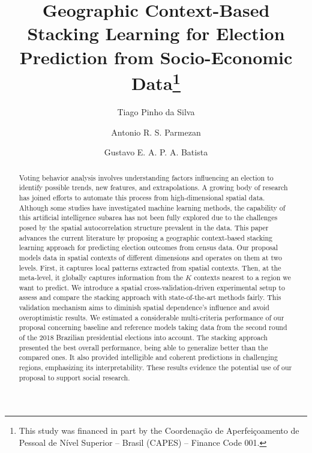 \documentclass[runningheads]{llncs}
\begin{document}
%
\title{Geographic Context-Based Stacking Learning for Election Prediction from Socio-Economic Data\thanks{This study was financed in part by the Coordena{\c{c}}\~{a}o de Aperfei{\c{c}}oamento de Pessoal de N\'{i}vel Superior -- Brasil (CAPES) -- Finance Code 001.}}
%
%
\author{Tiago Pinho da Silva \and
Antonio R. S. Parmezan \and
Gustavo E. A. P. A. Batista}
%
%
%
\maketitle %
%
\begin{abstract}
Voting behavior analysis involves understanding factors influencing an election to identify possible trends, new features, and extrapolations. A growing body of research has joined efforts to automate this process from high-dimensional spatial data. Although some studies have investigated machine learning methods, the capability of this artificial intelligence subarea has not been fully explored due to the challenges posed by the spatial autocorrelation structure prevalent in the data. This paper advances the current literature by proposing a geographic context-based stacking learning approach for predicting election outcomes from census data. Our proposal models data in spatial contexts of different dimensions and operates on them at two levels. First, it captures local patterns extracted from spatial contexts. Then, at the meta-level, it globally captures information from the $K$ contexts nearest to a region we want to predict. We introduce a spatial cross-validation-driven experimental setup to assess and compare the stacking approach with state-of-the-art methods fairly. This validation mechanism aims to diminish spatial dependence's influence and avoid overoptimistic results. We estimated a considerable multi-criteria performance of our proposal concerning baseline and reference models taking data from the second round of the 2018 Brazilian presidential elections into account. The stacking approach presented the best overall performance, being able to generalize better than the compared ones. It also provided intelligible and coherent predictions in challenging regions, emphasizing its interpretability. These results evidence the potential use of our proposal to support social research.

\end{abstract}
\end{document}
